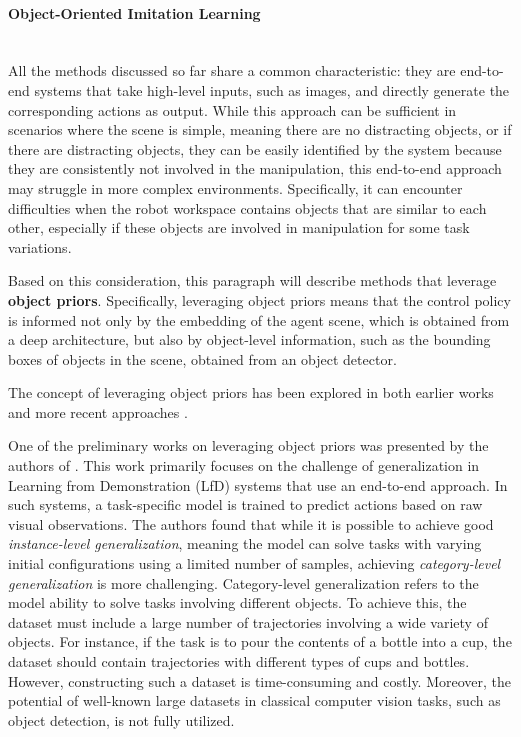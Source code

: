 \paragraph*{Object-Oriented Imitation Learning}\mbox{}\\
All the methods discussed so far share a common characteristic: they are end-to-end systems that take high-level inputs, such as images, and directly generate the corresponding actions as output. While this approach can be sufficient in scenarios where the scene is simple, meaning there are no distracting objects, or if there are distracting objects, they can be easily identified by the system because they are consistently not involved in the manipulation, this end-to-end approach may struggle in more complex environments. Specifically, it can encounter difficulties when the robot workspace contains objects that are similar to each other, especially if these objects are involved in manipulation for some task variations.

Based on this consideration, this paragraph will describe methods that leverage \textbf{object priors}. Specifically, leveraging object priors means that the control policy is informed not only by the embedding of the agent scene, which is obtained from a deep architecture, but also by object-level information, such as the bounding boxes of objects in the scene, obtained from an object detector.

The concept of leveraging object priors has been explored in both earlier works \cite{devin2018deep,park2021object} and more recent approaches \cite{belkhale2023plato,zhu2023viola,zhu2023learning,jiang2023vima}.

One of the preliminary works on leveraging object priors was presented by the authors of \cite{devin2018deep}. This work primarily focuses on the challenge of generalization in Learning from Demonstration (LfD) systems that use an end-to-end approach. In such systems, a task-specific model is trained to predict actions based on raw visual observations. The authors found that while it is possible to achieve good \textit{instance-level generalization}, meaning the model can solve tasks with varying initial configurations using a limited number of samples, achieving \textit{category-level generalization} is more challenging. Category-level generalization refers to the model ability to solve tasks involving different objects. To achieve this, the dataset must include a large number of trajectories involving a wide variety of objects. For instance, if the task is to pour the contents of a bottle into a cup, the dataset should contain trajectories with different types of cups and bottles. However, constructing such a dataset is time-consuming and costly. Moreover, the potential of well-known large datasets in classical computer vision tasks, such as object detection, is not fully utilized.

